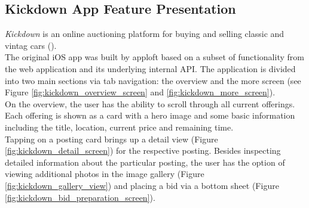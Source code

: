\subsection{Kickdown App Feature Presentation} \label{section:kickdown_feature_presentation}
\textit{Kickdown} is an online auctioning platform for buying and selling classic and vintag cars (\cite{Kickdown2021}).\\
The original iOS app was built by apploft based on a subset of functionality from the web application and its underlying internal API.
The application is divided into two main sections via tab navigation: the overview and the more screen (see Figure \ref{fig:kickdown_overview_screen} and \ref{fig:kickdown_more_screen}).\\
On the overview, the user has the ability to scroll through all current offerings. Each offering is shown as a card with a hero image 
and some basic information including the title, location, current price and remaining time.\\
Tapping on a posting card brings up a detail view (Figure \ref{fig:kickdown_detail_screen}) for the respective posting.
Besides inspecting detailed information about the particular posting, the user has the option of viewing additional photos in the image gallery (Figure \ref{fig:kickdown_gallery_view}) and placing a bid via a bottom sheet (Figure \ref{fig:kickdown_bid_preparation_screen}).





